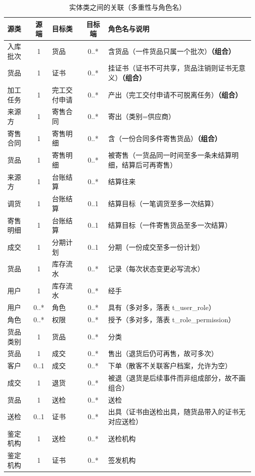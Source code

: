 \documentclass[12pt, a4paper]{ctexart}
\begin{document}
\begin{table}[H]
\centering
\small
\caption{实体类之间的关联（多重性与角色名）}
\label{tab:rels}
\begin{tabularx}{\textwidth}{@{}l c l c X@{}}
\toprule
源类 & 源端 & 目标类 & 目标端 & 角色名与说明 \\
\midrule
入库批次 & 1 & 货品 & 0..* & 含货品（一件货品只属一个批次）\textbf{（组合）} \\
货品 & 1 & 证书 & 0..* & 挂证书（证书不可共享，货品注销则证书无意义）\textbf{（组合）} \\
加工任务 & 1 & 完工交付申请 & 0..* & 产出（完工交付申请不可脱离任务）\textbf{（组合）} \\
来源方 & 1 & 寄售合同 & 0..* & 寄出（类别=供应商） \\
寄售合同 & 1 & 寄售明细 & 0..* & 含（一份合同多件寄售货品）\textbf{（组合）} \\
货品 & 1 & 寄售明细 & 0..* & 被寄售（一货品同一时间至多一条未结算明细，结算后可再寄售） \\
来源方 & 1 & 台账结算 & 0..* & 结算往来 \\
调货 & 1 & 台账结算 & 0..1 & 结算目标（一笔调货至多一次结算） \\
寄售明细 & 1 & 台账结算 & 0..1 & 结算目标（一件寄售货品至多一次结算） \\
成交 & 1 & 分期计划 & 0..1 & 分期（一份成交至多一份计划） \\
货品 & 1 & 库存流水 & 0..* & 记录（每次状态变更必写流水） \\
用户 & 1 & 库存流水 & 0..* & 经手 \\
用户 & 0..* & 角色 & 0..* & 具有（多对多，落表 t\_user\_role） \\
角色 & 0..* & 权限 & 0..* & 授予（多对多，落表 t\_role\_permission） \\
货品类别 & 1 & 货品 & 0..* & 分类 \\
货品 & 1 & 成交 & 0..* & 售出（退货后仍可再售，故可多次） \\
客户 & 0..1 & 成交 & 0..* & 下单（散客不关联客户档案，允许为空） \\
成交 & 1 & 退货 & 0..* & 被退（退货是后续事件而非组成部分，故不画组合） \\
货品 & 1 & 送检 & 0..* & 送检 \\
送检 & 0..1 & 证书 & 0..* & 出具（证书由送检出具，随货品带入的证书无对应送检） \\
鉴定机构 & 1 & 送检 & 0..* & 送检机构 \\
鉴定机构 & 1 & 证书 & 0..* & 签发机构 \\

\end{tabularx}
\end{table}
\end{document}
